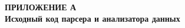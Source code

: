 
\begin{center}
  \textbf{
  \MakeUppercase{Приложение А}\\
  Исходный код парсера и анализатора данных}
\end{center}





